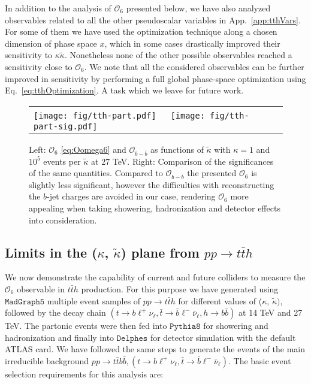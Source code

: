 \documentclass[11pt,a4paper]{article}
\newcommand{\mc}[1]{\mathcal{#1}}
\begin{document}
In addition to the analysis of $\mc{O}_{6}$ presented below, we have also analyzed observables related to all the other pseudoscalar variables in App.~\ref{app:tthVars}. For some of them we have used the optimization technique along a chosen dimension of phase space $x$, which in some cases drastically improved their sensitivity to $\kappa \tilde \kappa$. Nonetheless none of the other possible observables reached a sensitivity close to $\mc{O}_6$. We note that all the considered observables can be further improved in sensitivity by performing a full global phase-space optimization using Eq.~\eqref{eq:tthOptimization}. A task which we leave for future work.

\begin{figure}[t!]
	\centering
	\begin{tabular}{lr}
		\texttt{[image: fig/tth-part.pdf]}\ \  \ \texttt{[image: fig/tth-part-sig.pdf]}
	\end{tabular}
	
	\caption{Left: $\mc{O}_6$ \eqref{eq:Oomega6} and $\mc{O}_{b-\bar{b}}$ as functions of $\tilde \kappa$ with $\kappa = 1$ and $10^5$ events per $\tilde{\kappa}$ at 27 TeV. Right: Comparison of the significances of the same quantities. Compared to $\mc{O}_{b-\bar{b}}$ the presented $\mc{O}_6$ is slightly less significant, however the difficulties with reconstructing the $b$-jet charges are avoided in our case, rendering $\mc{O}_6$ more appealing when taking showering, hadronization and detector effects into consideration.}
	\label{fig:tth-part}
\end{figure}






\subsection{Limits in the ($\kappa$, $\tilde{\kappa}$) plane from $pp\to t\bar th$}
We now demonstrate the capability of current and future colliders to measure the $\mc{O}_6$ observable in $t\bar t h$ production. For this purpose we have generated using $\texttt{MadGraph5}$ multiple event samples of $p p \to t \bar{t} h$ for different values of ($\kappa$, $\tilde{\kappa})$, followed by the decay chain  $(t \to b \ell^+ \nu_\ell,\bar{t} \to \bar{b} \ell^- \bar{\nu}_\ell, h \to b \bar{b})$ at 14 TeV and 27 TeV. The partonic events were then fed into $\texttt{Pythia8}$ for showering and hadronization and finally into $\texttt{Delphes}$ for detector simulation with the default ATLAS card. We have followed the same steps to generate the events of the main irreducible background $p p \to t \bar{t} b \bar{b}, ( t \to b \ell^+ \nu_\ell,\bar{t} \to \bar{b} \ell^- \bar{\nu}_\ell)$. The basic event selection requirements for this analysis are:
\end{document}
